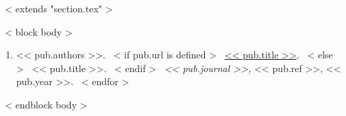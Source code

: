 ~< extends "section.tex" >~

~< block body >~
  \begin{enumerate}
    ~< for pub in items >~
      \item{
        << pub.authors >>.
        ~< if pub.url is defined >~
          \href{<< pub.url >>}{<< pub.title >>}.
        ~< else >~
          << pub.title >>.
        ~< endif >~
        \emph{<< pub.journal >>,}
        << pub.ref >>,
        << pub.year >>.
      }
    ~< endfor >~
  \end{enumerate}
~< endblock body >~

